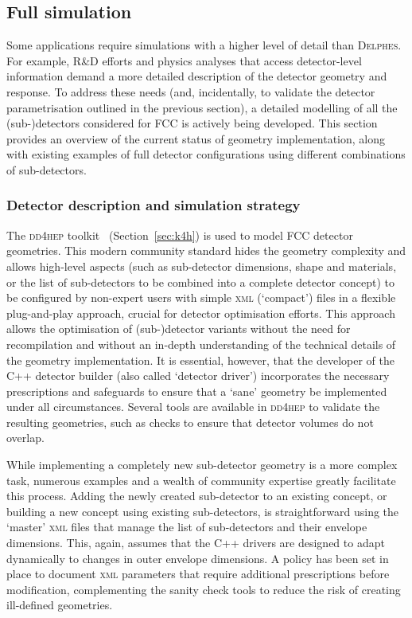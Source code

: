 \subsection{Full simulation}
\label{sec:geometries}

Some applications require simulations with a higher level of detail than \textsc{Delphes}. For example, R\&D efforts and physics analyses that access detector-level information demand a more detailed description of the detector geometry and response. 
To address these needs (and, incidentally, to validate the detector parametrisation outlined in the previous section), a detailed modelling of all the (sub-)detectors considered for FCC is actively being developed. This section provides an overview of the current status of geometry implementation, along with existing examples of full detector configurations using different combinations of sub-detectors.

\subsubsection{Detector description and simulation strategy}
\label{sec:geometryStrategy}

The \textsc{dd4hep} toolkit~\cite{dd4hep} (Section~\ref{sec:k4h}) is used to model FCC detector geometries. 
This modern community standard hides the geometry complexity and allows high-level aspects 
(such as sub-detector dimensions, shape and materials, or the list of sub-detectors to be combined into a complete detector concept) 
to be configured by non-expert users with simple \textsc{xml} (`compact') files in a flexible plug-and-play approach, crucial for detector optimisation efforts.
This approach allows the optimisation of (sub-)detector variants without the need for recompilation and without an in-depth understanding of the technical details of the geometry implementation. 
It is essential, however, that the developer of the C++ detector builder (also called `detector driver') 
incorporates the necessary prescriptions and safeguards to ensure that a `sane' geometry be implemented under all circumstances. 
Several tools are available in \textsc{dd4hep} to validate the resulting geometries, such as checks to ensure that detector volumes do not overlap. 

While implementing a completely new sub-detector geometry is a more complex task, 
numerous examples and a wealth of community expertise greatly facilitate this process. 
Adding the newly created sub-detector to an existing concept, 
or building a new concept using existing sub-detectors, 
is straightforward using the `master' \textsc{xml} files that manage the list of sub-detectors and their envelope dimensions. 
This, again, assumes that the C++ drivers are designed to adapt dynamically to changes in outer envelope dimensions. 
A policy has been set in place to document \textsc{xml} parameters that require additional prescriptions before modification, 
complementing the sanity check tools to reduce the risk of creating ill-defined geometries.

